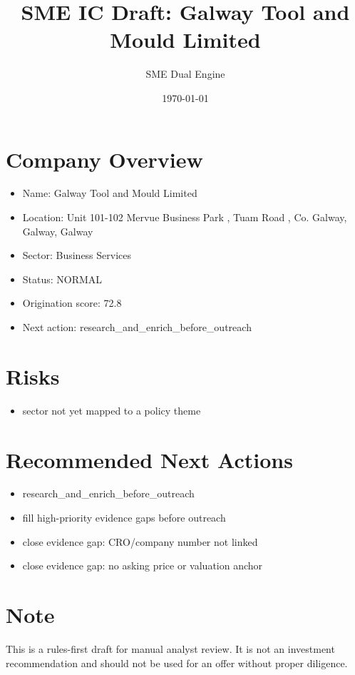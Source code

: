 \documentclass[11pt,a4paper]{article}
\title{SME IC Draft: Galway Tool and Mould Limited}
\author{SME Dual Engine}
\date{\today}
\begin{document}
\maketitle
\section*{Company Overview}
\begin{itemize}[leftmargin=1.4em]
\item Name: Galway Tool and Mould Limited
\item Location: Unit 101-102 Mervue Business Park , Tuam Road , Co. Galway, Galway, Galway
\item Sector: Business Services
\item Status: NORMAL
\item Origination score: 72.8
\item Next action: research\_and\_enrich\_before\_outreach
\end{itemize}
\section*{Risks}
\begin{itemize}[leftmargin=1.4em]
\item sector not yet mapped to a policy theme
\end{itemize}
\section*{Recommended Next Actions}
\begin{itemize}[leftmargin=1.4em]
\item research\_and\_enrich\_before\_outreach
\item fill high-priority evidence gaps before outreach
\item close evidence gap: CRO/company number not linked
\item close evidence gap: no asking price or valuation anchor
\end{itemize}
\section*{Note}
This is a rules-first draft for manual analyst review. It is not an investment
recommendation and should not be used for an offer without proper diligence.
\end{document}
